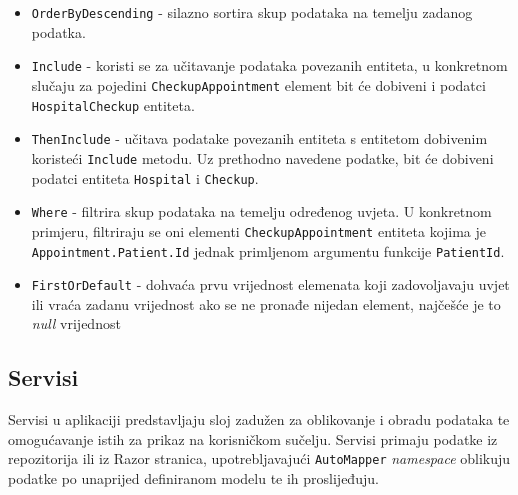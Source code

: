 \begin{itemize}
\item \texttt{OrderByDescending} - silazno sortira skup podataka na temelju zadanog podatka.

\item \texttt{Include} - koristi se za učitavanje podataka povezanih entiteta, u konkretnom slučaju za pojedini \texttt{CheckupAppointment} element bit će dobiveni i podatci \\\texttt{HospitalCheckup} entiteta.

\item \texttt{ThenInclude} - učitava podatake povezanih entiteta s entitetom dobivenim koristeći \texttt{Include} metodu. Uz prethodno navedene podatke, bit će dobiveni podatci entiteta \texttt{Hospital} i \texttt{Checkup}.

\item \texttt{Where} - filtrira skup podataka na temelju određenog uvjeta. U konkretnom primjeru, filtriraju se oni elementi \texttt{CheckupAppointment} entiteta kojima je \\\texttt{Appointment.Patient.Id} jednak primljenom argumentu funkcije \texttt{PatientId}.

\item \texttt{FirstOrDefault} - dohvaća prvu vrijednost elemenata koji zadovoljavaju uvjet ili vraća zadanu vrijednost ako se ne pronađe nijedan element, najčešće je to \textit{null} vrijednost
\end{itemize}

\subsection{Servisi}

Servisi u aplikaciji predstavljaju sloj zadužen za oblikovanje i obradu podataka te omogućavanje istih za prikaz na korisničkom sučelju. Servisi primaju podatke iz repozitorija ili iz Razor stranica, upotrebljavajući \texttt{AutoMapper} \textit{namespace} oblikuju podatke po unaprijed definiranom modelu te ih proslijeđuju. 

